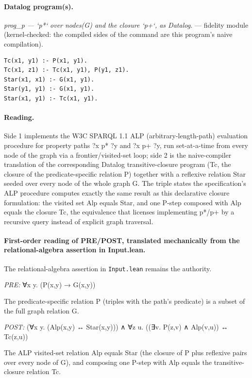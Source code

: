 \documentclass[10pt]{article}
\begin{document}
\paragraph{Datalog program(s).}

{\raggedright\textit{prog\_p --- `p*` over nodes(G) and the closure `p+`, as Datalog.} --- fidelity module (kernel-checked: the compiled sides of the command are this program's naive compilation).\par}

\begin{Verbatim}[fontsize=\scriptsize,breaklines=true,breakanywhere=true,frame=single,framesep=1.5mm]
Tc(x1, y1) :- P(x1, y1).
Tc(x1, z1) :- Tc(x1, y1), P(y1, z1).
Star(x1, x1) :- G(x1, y1).
Star(y1, y1) :- G(x1, y1).
Star(x1, y1) :- Tc(x1, y1).
\end{Verbatim}

\paragraph{Reading.} Side 1 implements the W3C SPARQL 1.1 ALP (arbitrary-length-path) evaluation procedure for property paths ?x p* ?y and ?x p+ ?y, run set-at-a-time from every node of the graph via a frontier/visited-set loop; side 2 is the naive-compiler translation of the corresponding Datalog transitive-closure program (Tc, the closure of the predicate-specific relation P) together with a reflexive relation Star seeded over every node of the whole graph G. The triple states the specification's ALP procedure computes exactly the same result as this declarative closure formulation: the visited set Alp equals Star, and one P-step composed with Alp equals the closure Tc, the equivalence that licenses implementing p*/p+ by a recursive query instead of explicit graph traversal.

\paragraph{First-order reading of PRE/POST, translated mechanically from the relational-algebra assertion in Input.lean.} The relational-algebra assertion in \texttt{Input.lean} remains the authority.

\textit{PRE:} ∀x y. (P(x,y) → G(x,y))\par The predicate-specific relation P (triples with the path's predicate) is a subset of the full graph relation G.

\textit{POST:} (∀x y. (Alp(x,y) ↔ Star(x,y))) ∧ ∀z u. ((∃v. P(z,v) ∧ Alp(v,u)) ↔ Tc(z,u))\par The ALP visited-set relation Alp equals Star (the closure of P plus reflexive pairs over every node of G), and composing one P-step with Alp equals the transitive-closure relation Tc.
\end{document}
